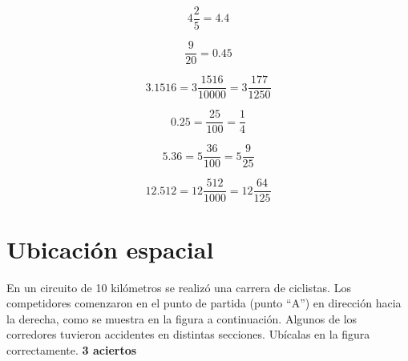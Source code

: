 \documentclass[11pt]{article}
\begin{document}
\begin{multicols}{2}

    \begin{equation}  4\frac{2}{5} = 4.4 \nonumber \end{equation}
    
    \vspace{5mm}

    \begin{equation}  \frac{9}{20} = 0.45 \nonumber \end{equation}
    
    \vspace{5mm}

    \begin{equation}  3.1516 \nonumber = 3\frac{1516}{10000} = 3\frac{177}{1250} \end{equation}
    
    \vspace{5mm}

    \begin{equation}  0.25 \nonumber = \frac{25}{100} = \frac{1}{4} \end{equation}
    
    \vspace{5mm}

    \begin{equation}  5.36 \nonumber = 5\frac{36}{100} = 5\frac{9}{25}   \end{equation}
    
    \vspace{5mm}

    \begin{equation}  12.512 \nonumber = 12\frac{512}{1000} = 12\frac{64}{125} \end{equation}
\end{multicols}

\vspace{1cm}


\section{Ubicaci\'on espacial}
En un circuito de 10 kil\'ometros se realiz\'o una carrera de ciclistas. Los
competidores comenzaron en el punto de partida (punto ``A'') en direcci\'on
hacia la derecha, como se muestra en la figura a continuaci\'on. Algunos de los
corredores tuvieron accidentes en distintas secciones. Ub\'icalas en la figura
correctamente.  \hfill \textbf{3 aciertos}\\
\end{document}
